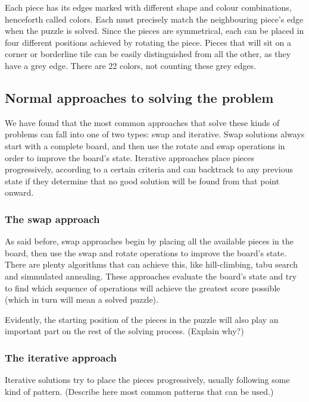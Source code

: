 \documentclass{llncs}
\begin{document}
Each piece has its edges marked with different shape and colour combinations, henceforth called colors. Each must precisely match the neighbouring piece's edge when the puzzle is solved. Since the pieces are symmetrical, each can be placed in four different positions achieved by rotating the piece. Pieces that will sit on a corner or borderline tile can be easily distinguished from all the other, as they have a grey edge. There are 22 colors, not counting these grey edges. 


\subsection{Normal approaches to solving the problem}

We have found that the most common approaches that solve these kinds of problems can fall into one of two types: swap and iterative. Swap solutions always start with a complete board, and then use the rotate and swap operations in order to improve the board's state. Iterative approaches place pieces progressively, according to a certain criteria and can backtrack to any previous state if they determine that no good solution will be found from that point onward.

\subsubsection{The swap approach}

As said before, swap approaches begin by placing all the available pieces in the board, then use the swap and rotate operations to improve the board's state. There are plenty algorithms that can achieve this, like hill-climbing, tabu search and simmulated annealing. These approaches evaluate the board's state and try to find which sequence of operations will achieve the greatest score possible (which in turn will mean a solved puzzle).

Evidently, the starting position of the pieces in the puzzle will also play an important part on the rest of the solving process. (Explain why?)

\subsubsection{The iterative approach}

Iterative solutions try to place the pieces progressively, usually following some kind of pattern.
(Describe here most common patterns that can be used.)
\end{document}

